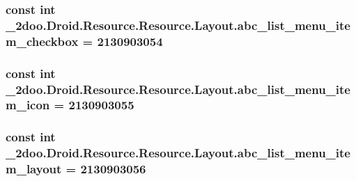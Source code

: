 \hypertarget{class__2doo_1_1_droid_1_1_resource_1_1_layout_58cb2b6f8799d54855e1bbf401b64183}{
\subsubsection[{abc\_\-list\_\-menu\_\-item\_\-checkbox}]{\setlength{\rightskip}{0pt plus 5cm}const int \_\-2doo.Droid.Resource.Resource.Layout.abc\_\-list\_\-menu\_\-item\_\-checkbox = 2130903054}}
\label{class__2doo_1_1_droid_1_1_resource_1_1_layout_58cb2b6f8799d54855e1bbf401b64183}


\hypertarget{class__2doo_1_1_droid_1_1_resource_1_1_layout_b0b4b66952c10a81acbb51ad08c27e4b}{
\subsubsection[{abc\_\-list\_\-menu\_\-item\_\-icon}]{\setlength{\rightskip}{0pt plus 5cm}const int \_\-2doo.Droid.Resource.Resource.Layout.abc\_\-list\_\-menu\_\-item\_\-icon = 2130903055}}
\label{class__2doo_1_1_droid_1_1_resource_1_1_layout_b0b4b66952c10a81acbb51ad08c27e4b}


\hypertarget{class__2doo_1_1_droid_1_1_resource_1_1_layout_2a79d69c54a6551b19a9e8eb365fc72a}{
\subsubsection[{abc\_\-list\_\-menu\_\-item\_\-layout}]{\setlength{\rightskip}{0pt plus 5cm}const int \_\-2doo.Droid.Resource.Resource.Layout.abc\_\-list\_\-menu\_\-item\_\-layout = 2130903056}}
\label{class__2doo_1_1_droid_1_1_resource_1_1_layout_2a79d69c54a6551b19a9e8eb365fc72a}


